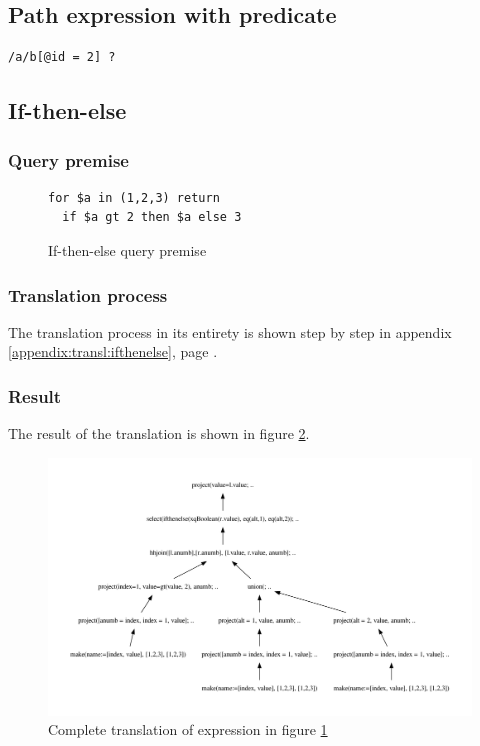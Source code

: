 \subsection{Path expression with predicate}
\begin{Verbatim}
/a/b[@id = 2] ?
\end{Verbatim}

\subsection{If-then-else}
\subsubsection{Query premise}
\begin{figure}[!htp]
\begin{center}
\begin{Verbatim}
for $a in (1,2,3) return
  if $a gt 2 then $a else 3
\end{Verbatim}
  \caption{If-then-else query premise}
  \label{fig:results:query_ifthenelse}
\end{center}
\end{figure}

\subsubsection{Translation process}
The translation process in its entirety is shown step by step in appendix
\ref{appendix:transl:ifthenelse}, page \pageref{appendix:transl:ifthenelse}.

\subsubsection{Result}
The result of the translation is shown in figure
\ref{fig:results:query_ifthenelse_result}.

\begin{figure}[htp]
\begin{center}
  \includegraphics[scale=0.5]{img/graphs/ifthenelse}
  \caption{Complete translation of expression in figure
  \ref{fig:results:query_ifthenelse}}
  \label{fig:results:query_ifthenelse_result}
\end{center}
\end{figure}

